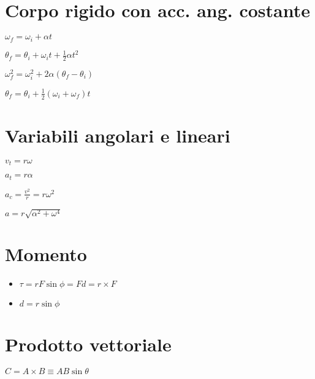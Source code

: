 \documentclass[a4paper,14pt,landscape]{extarticle}
\begin{document}
\begin{multicols*}{2}
    \section*{Corpo rigido con acc. ang. costante}
    \begin{itemize}
        \begin{multicols*}{2}
            \item $\omega_f = \omega_i + \alpha t$
            \item $\theta_f = \theta_i + \omega_i t + \tfrac{1}{2} \alpha t^2$ 
            \item $\omega_f^2 = \omega_i^2 + 2\alpha (\theta_f - \theta_i)$
            \item $\theta_f = \theta_i + \tfrac{1}{2}(\omega_i + \omega_f)t$
        \end{multicols*}
    \end{itemize}

    \section*{Variabili angolari e lineari}
    \begin{itemize}
        \begin{multicols*}{2}
            \item $v_t = r\omega$
            \item $a_t = r\alpha$
            \item $a_c = \tfrac{v^2}{r} = r\omega^2$
            \item $a = r\sqrt{\alpha^2 + \omega^4}$
        \end{multicols*}
    \end{itemize}

    \section*{Momento}
    \begin{itemize}
        \item $\tau = rF\sin{\phi} = Fd = r \times F$
        \item $d = r\sin{\phi}$
    \end{itemize}

    \section*{Prodotto vettoriale}
    \begin{itemize}
        \begin{multicols}{2}
        \item $C = A \times B \equiv AB\sin{\theta}$
        \end{multicols}
    \end{itemize}


\end{multicols*}
\end{document}
